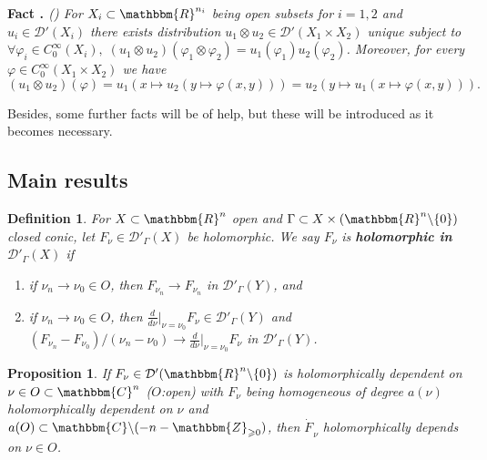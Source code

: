 \documentclass{article}
\newcommand{\tmtextbf}[1]{{\bfseries{#1}}}
\newcommand{\tmtextit}[1]{{\itshape{#1}}}
\newcommand{\tmtextup}[1]{{\upshape{#1}}}
\newtheorem{definition}{Definition}
\numberwithin{definition}{section}
\numberwithin{lemma}{section}
\newtheorem{proposition}{Proposition}
\numberwithin{proposition}{section}
{\theorembodyfont{\rmfamily}\newtheorem{remark}{Remark}
\numberwithin{remark}{section}
}
\begin{document}
{\noindent}\tmtextbf{Fact \tmtextup{3}.
}\tmtextit{\label{holomorphicity-preserving:fact-tensor}({\cite[thm.
5.1.1]{hormander1983analysis}}) For $X_i \subset \mathbbm{R}^{n_i}$ being open
subsets for $i = 1, 2$ and $u_i \in \mathcal{D}' ( X_i)$ there exists
distribution $u_1 \otimes u_2 \in \mathcal{D}' ( X_1 \times X_2)$ unique
subject to $\forall \varphi_i \in C^{\infty}_0 ( X_i), \; ( u_1 \otimes u_2) (
\varphi_1 \otimes \varphi_2) = u_1 ( \varphi_1) u_2 ( \varphi_2)$. Moreover,
for every $\varphi \in C_0^{\infty} ( X_1 \times X_2)$ we have
\[ ( u_1 \otimes u_2) ( \varphi) = u_1 ( x \mapsto u_2 ( y \mapsto \varphi (
   x, y))) = u_2 ( y \mapsto u_1 ( x \mapsto \varphi ( x, y))) .
\]}{\hspace*{\fill}}{\medskip}

Besides, some further facts will be of help, but these will be introduced as
it becomes necessary.

\subsection{Main results}

\begin{definition}
  \label{holomorphicity-preserving:def-holo-in-DG}For $X \subset
  \mathbbm{R}^n$ open and $\Gamma \subset X \times ( \mathbbm{R}^n \backslash
  \{ 0 \})$ closed conic, let $F_{\nu} \in \mathcal{D}'_{\Gamma} ( X)$ be
  holomorphic. We say $F_{\nu}$ is \tmtextbf{holomorphic in
  $\mathcal{D}'_{\Gamma} ( X)$} if
  \begin{enumerate}
    \item if $\nu_n \rightarrow \nu_0 \in O$, then $F_{\nu_n} \rightarrow
    F_{\nu_n}$ in $\mathcal{D}'_{\Gamma} ( Y)$, and
    
    \item if $\nu_n \rightarrow \nu_0 \in O$, then $\frac{d}{d \nu} |_{\nu =
    \nu_0} F_{\nu} \in \mathcal{D}'_{\Gamma} ( Y)$ and $( F_{\nu_n} -
    F_{\nu_0}) / ( \nu_n - \nu_0) \rightarrow \frac{d}{d \nu} |_{\nu = \nu_0}
    F_{\nu}$ in $\mathcal{D}'_{\Gamma} ( Y)$.
  \end{enumerate}
\end{definition}

\begin{proposition}
  \label{holomorphicity-preserving:prop-homog-holo}If $F_{\nu} \in
  \mathcal{D}' ( \mathbbm{R}^n \backslash \{ 0 \})$ is holomorphically
  dependent on $\nu \in O \subset \mathbbm{C}^n$ ($O$:open) with $F_{\nu}$
  being homogeneous of degree $a ( \nu)$ holomorphically dependent on $\nu$
  and $a ( O) \subset \mathbbm{C}\backslash ( - n -\mathbbm{Z}_{\geqslant
  0})$, then $\dot{F_{}}_{\nu}$ holomorphically depends on $\nu \in O$.
\end{proposition}
\end{document}

